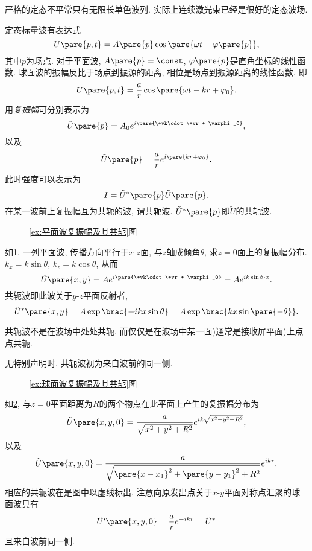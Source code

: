 \documentclass{ctexart}
\begin{document}
\begin{remark}
    严格的定态不平常只有无限长单色波列. 实际上连续激光束已经是很好的定态波场.
\end{remark}
定态标量波有表达式
\[ U\pare{p,t} = A\pare{p}\cos\pare{\omega t - \varphi\pare{p}}, \]
其中$p$为场点. 对于平面波, $A\pare{p} = \const$, $\varphi\pare{p}$是直角坐标的线性函数. 球面波的振幅反比于场点到振源的距离, 相位是场点到振源距离的线性函数, 即
\[ U\pare{p,t} = \frac{a}{r}\cos\pare{\omega t - kr + \varphi_0}. \]
用\emph{复振幅}可分别表示为
\[ \tilde{U}\pare{p} = A_0e^{i\pare{\+vk\cdot\+vr + \varphi_0}}, \]
以及
\[ \tilde{U}\pare{p} = \frac{a}{r}e^{i\pare{kr + \varphi_0}}. \]
此时强度可以表示为
\[ I = \tilde{U}^*\pare{p} \tilde{U}\pare{p}. \]
在某一{\color{red}波前}上复振幅互为共轭的波, 谓共轭波. $\tilde{U}^*\pare{p}$即$\tilde{U}$的共轭波.
\begin{figure}
    \centering
    \caption{\cref{ex:平面波复振幅及其共轭}图}
    \label{fig:平面波复振幅及其共轭图}
\end{figure}
\begin{sample}
    \begin{ex}
        \label{ex:平面波复振幅及其共轭}
        如\cref{fig:平面波复振幅及其共轭图}. 一列平面波, 传播方向平行于$x$-$z$面, 与$z$轴成倾角$\theta$, 求$z=0$面上的复振幅分布. $k_x = k\sin\theta$, $k_z = k \cos\theta$, 从而
        \[ \tilde{U}\pare{x,y} = Ae^{i\pare{\+vk\cdot\+vr + \varphi_0}} = Ae^{ik\sin\theta \cdot x}. \]
        共轭波即此波关于$y$-$z$平面反射者,
        \[ \tilde{U}^*\pare{x,y} = A\exp\brac{-ikx\sin\theta} = A\exp\brac{kx\sin\pare{-\theta}}.  \]
    \end{ex}
\end{sample}
\begin{pitfall}
    共轭波不是在波场中处处共轭, 而仅仅是在波场中某一面)通常是接收屏平面)上点点共轭.
\end{pitfall}
\begin{pitfall}
    无特别声明时, 共轭波视为来自波前的同一侧.
\end{pitfall}
\begin{figure}
    \centering
    \caption{\cref{ex:球面波复振幅及其共轭}图}
    \label{fig:球面波复振幅及其共轭图}
\end{figure}
\begin{sample}
    \begin{ex}
        \label{ex:球面波复振幅及其共轭}
        如\cref{fig:球面波复振幅及其共轭图}, 与$z=0$平面距离为$R$的两个物点在此平面上产生的复振幅分布为
        \[ \tilde{U}\pare{x,y,0} = \frac{a}{\sqrt{x^2+y^2+R^2}}e^{ik\sqrt{x^2+y^2+R^2}}, \]
        以及
        \[ \tilde{U}\pare{x,y,0} = \frac{a}{\sqrt{\pare{x-x_1}^2 + \pare{y-y_1}^2 + R^2}}e^{ikr}. \]
        相应的共轭波在是图中以虚线标出, 注意向原发出点关于$x$-$y$平面对称点汇聚的球面波具有
        \[ \tilde{U'}\pare{x,y,0} = \frac{a}{r}e^{-ikr} = \tilde{U}^* \]
        且来自波前同一侧.
    \end{ex}
\end{sample}
\end{document}
